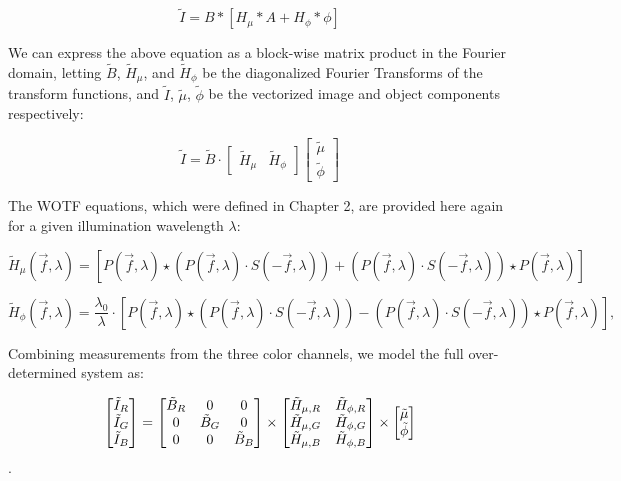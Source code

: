 \begin{equation}
\tilde{I} = B * [ H_{\mu} * A + H_{\phi} * \phi]
\end{equation}

We can express the above equation as a block-wise matrix product in the Fourier domain, letting $\tilde{B}$, $\tilde{H}_{\mu}$, and $\tilde{H}_{\phi} $ be the diagonalized Fourier Transforms of the transform functions, and $\tilde{I}$, $\tilde{\mu}$, $\tilde{\phi}$ be the vectorized image and object components respectively:

\begin{equation}\label{forwardModelSingle}
\tilde{I} = \tilde{B} \cdot \begin{bmatrix} \tilde{H}_{\mu} & \tilde{H}_{\phi}\end{bmatrix}  \begin{bmatrix}\tilde{\mu}\\ \tilde{\phi} \end{bmatrix}
\end{equation}

The WOTF equations, which were defined in Chapter 2, are provided here again for a given illumination wavelength $\lambda $:

\begin{equation}\label{WOTFre_2}
\tilde{H}_{\mu}(\vec{f},\lambda) = \left[  P(\vec{f},\lambda) \star (P(\vec{f},\lambda)\cdot S(-\vec{f},\lambda))+ (P(\vec{f},\lambda) \cdot S(-\vec{f},\lambda)) \star P(\vec{f},\lambda)\right]
\end{equation}

\begin{equation}\label{WOTFim_2}
\tilde{H}_{\phi}(\vec{f},\lambda) = \frac{\lambda_0}{\lambda}\cdot\left[ P(\vec{f},\lambda) \star (P(\vec{f},\lambda)\cdot S(-\vec{f},\lambda))- (P(\vec{f},\lambda) \cdot S(-\vec{f},\lambda)) \star P(\vec{f},\lambda) \right],
\end{equation}

Combining measurements from the three color channels, we model the full over-determined system as:

\begin{equation}\label{forwardModel}
\begin{bmatrix}
\tilde{I}_{R}\cr \tilde{I}_{G}\cr \tilde{I}_{B}
\end{bmatrix}
= \begin{bmatrix}\tilde{B}_R & 0 & 0\cr 0 & \tilde{B}_G & 0 \cr 0 & 0 & \tilde{B}_B \end{bmatrix}
\times
\begin{bmatrix}\tilde{H}_{\mu,R} & \tilde{H}_{\phi,R}\cr \tilde{H}_{\mu,G} & \tilde{H}_{\phi,G}\cr \tilde{H}_{\mu,B} & \tilde{H}_{\phi,B}\end{bmatrix}
\times
 \begin{bmatrix}\tilde{\mu}\\ \tilde{\phi}\end{bmatrix}
\end{equation}.

